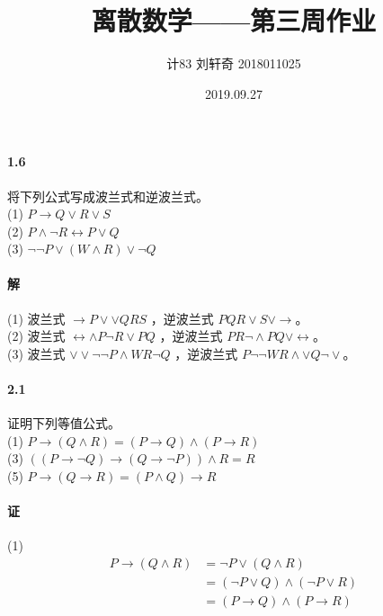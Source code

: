 \documentclass[hyperref, UTF8]{ctexart}
\title{离散数学——第三周作业}
\author{计83  刘轩奇  2018011025}
\date{2019.09.27}
\begin{document}
\maketitle

\paragraph{1.6}\label{1.6}
将下列公式写成波兰式和逆波兰式。\\

(1) $ P \rightarrow Q \lor R \lor S $ \\

(2) $ P \land \lnot R \leftrightarrow P \lor Q $ \\

(3) $ \lnot \lnot P \lor (W \land R) \lor \lnot Q $

\paragraph{解}

(1) 波兰式 $ \rightarrow P \lor \lor QRS $ ，逆波兰式 $ PQR \lor S \lor \rightarrow $。\\

(2) 波兰式 $ \leftrightarrow \land P \lnot R \lor PQ $ ，逆波兰式 $ PR \lnot \land PQ \lor \leftrightarrow $。\\

(3) 波兰式 $ \lor \lor \lnot \lnot P \land WR \lnot Q $ ，逆波兰式 $ P \lnot \lnot WR \land \lor Q \lnot \lor $。 \\

\paragraph{2.1}\label{2.1}
证明下列等值公式。\\

(1) $ P \rightarrow (Q \land R)=(P \rightarrow Q) \land (P \rightarrow R) $ \\

(3) $ ((P \rightarrow \lnot Q) \rightarrow (Q \rightarrow \lnot P)) \land R=R $ \\

(5) $ P \rightarrow (Q \rightarrow R)=(P \land Q) \rightarrow R $

\paragraph{证}

(1)
\begin{align*}
P \rightarrow (Q \land R) &= \lnot P \lor (Q \land R) \\
&=( \lnot P \lor Q) \land ( \lnot P \lor R) \\ &= (P \rightarrow Q) \land (P \rightarrow R)
\end{align*}
\end{document}
